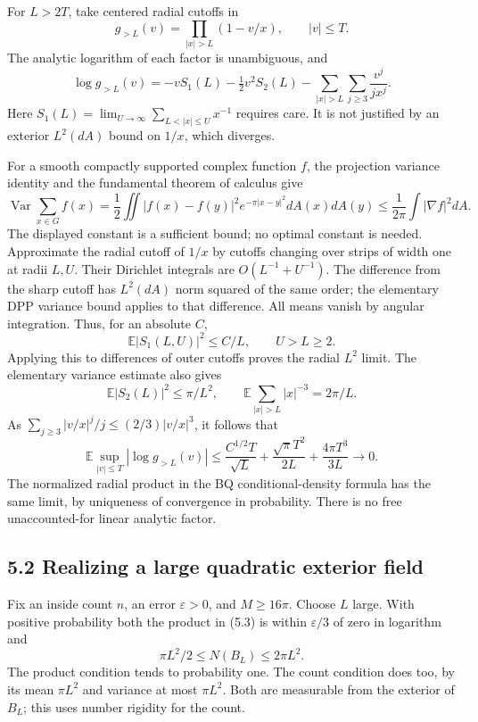 \documentclass[11pt,a4paper]{article}
\theoremstyle{definition}
\theoremstyle{remark}
\numberwithin{equation}{section}
\begin{document}
For \(L>2T\), take centered radial cutoffs in \[
g_{>L}(v)=\prod_{|x|>L}(1-v/x),\qquad |v|\le T.
\] The analytic logarithm of each factor is unambiguous, and \[
\log g_{>L}(v)=-vS_1(L)-\tfrac12v^2S_2(L)
-\sum_{|x|>L}\sum_{j\ge3}\frac{v^j}{jx^j}.
\] Here \(S_1(L)=\lim_{U\to\infty}\sum_{L<|x|\le U}x^{-1}\) requires care. It is not justified by an exterior \(L^2(dA)\) bound on \(1/x\), which diverges.

For a smooth compactly supported complex function \(f\), the projection variance identity and the fundamental theorem of calculus give \[
\operatorname{Var}\sum_{x\in G}f(x)
=\frac12\iint|f(x)-f(y)|^2e^{-\pi|x-y|^2}dA(x)dA(y)
\le\frac1{2\pi}\int|\nabla f|^2dA.
\tag{5.2}
\] The displayed constant is a sufficient bound; no optimal constant is needed. Approximate the radial cutoff of \(1/x\) by cutoffs changing over strips of width one at radii \(L,U\). Their Dirichlet integrals are \(O(L^{-1}+U^{-1})\). The difference from the sharp cutoff has \(L^2(dA)\) norm squared of the same order; the elementary DPP variance bound applies to that difference. All means vanish by angular integration. Thus, for an absolute \(C\), \[
\mathbb E|S_1(L,U)|^2\le C/L,\qquad U>L\ge2.
\] Applying this to differences of outer cutoffs proves the radial \(L^2\) limit. The elementary variance estimate also gives \[
\mathbb E|S_2(L)|^2\le\pi/L^2,\qquad
\mathbb E\sum_{|x|>L}|x|^{-3}=2\pi/L.
\] As \(\sum_{j\ge3}|v/x|^j/j\le(2/3)|v/x|^3\), it follows that \[
\mathbb E\sup_{|v|\le T}|\log g_{>L}(v)|
\le \frac{C^{1/2}T}{\sqrt L}
 +\frac{\sqrt\pi T^2}{2L}+\frac{4\pi T^3}{3L}
\longrightarrow0.
\tag{5.3}
\] The normalized radial product in the BQ conditional-density formula has the same limit, by uniqueness of convergence in probability. There is no free unaccounted-for linear analytic factor.

\hypertarget{realizing-a-large-quadratic-exterior-field}{%
\subsection{5.2 Realizing a large quadratic exterior field}\label{realizing-a-large-quadratic-exterior-field}}

Fix an inside count \(n\), an error \(\varepsilon>0\), and \(M\ge16\pi\). Choose \(L\) large. With positive probability both the product in (5.3) is within \(\varepsilon/3\) of zero in logarithm and \[
\pi L^2/2\le N(B_L)\le2\pi L^2.
\tag{5.4}
\] The product condition tends to probability one. The count condition does too, by its mean \(\pi L^2\) and variance at most \(\pi L^2\). Both are measurable from the exterior of \(B_L\); this uses number rigidity for the count.
\end{document}
